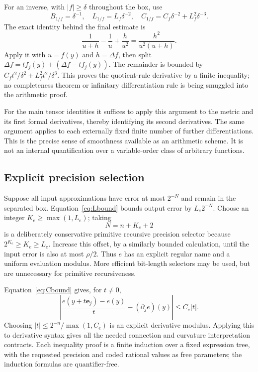\documentclass[11pt,a4paper]{article}
\numberwithin{equation}{section}
\theoremstyle{definition}\newtheorem{definition}[theorem]{Definition}
\theoremstyle{remark}\newtheorem{remark}[theorem]{Remark}
\begin{document}
For an inverse, with $|f|\ge\delta$ throughout the box, use
\begin{equation}\label{eq:inversebounds}
 B_{1/f}=\delta^{-1},\quad L_{1/f}=L_f\delta^{-2},\quad
 C_{1/f}=C_f\delta^{-2}+L_f^2\delta^{-3}.
\end{equation}
The exact identity behind the final estimate is
\begin{equation}\label{eq:inverseremainder}
 \frac1{u+h}-\frac1u+\frac h{u^2}
       =\frac{h^2}{u^2(u+h)}.
\end{equation}
Apply it with $u=f(y)$ and $h=\Delta f$, then split $\Delta f=t f_j(y)+(\Delta f-t f_j(y))$. The remainder is bounded by $C_f t^2/\delta^2+L_f^2t^2/\delta^3$. This proves the quotient-rule derivative by a finite inequality; no completeness theorem or infinitary differentiation rule is being smuggled into the arithmetic proof.

For the main tensor identities it suffices to apply this argument to the metric and its first formal derivatives, thereby identifying its second derivatives. The same argument applies to each externally fixed finite number of further differentiations. This is the precise sense of smoothness available as an arithmetic scheme. It is not an internal quantification over a variable-order class of arbitrary functions.

\subsection{Explicit precision selection}
Suppose all input approximations have error at most $2^{-N}$ and remain in the separated box. Equation~\eqref{eq:Lbound} bounds output error by $L_e2^{-N}$. Choose an integer $K_e\ge\max(1,L_e)$; taking
\[
 N=n+K_e+2
\]
is a deliberately conservative primitive recursive precision selector because $2^{K_e}\ge K_e\ge L_e$. Increase this offset, by a similarly bounded calculation, until the input error is also at most $\rho/2$. Thus $e$ has an explicit regular name and a uniform evaluation modulus. More efficient bit-length selectors may be used, but are unnecessary for primitive recursiveness.

Equation~\eqref{eq:Cbound} gives, for $t\ne0$,
\[
 \left|\frac{e(y+t\mathbf e_j)-e(y)}t-(\partial_je)(y)\right|
 \le C_e|t|.
\]
Choosing $|t|\le2^{-n}/\max(1,C_e)$ is an explicit derivative modulus. Applying this to derivative syntax gives all the needed connection and curvature interpretation contracts. Each inequality proof is a finite induction over a fixed expression tree, with the requested precision and coded rational values as free parameters; the induction formulas are quantifier-free.
\end{document}
